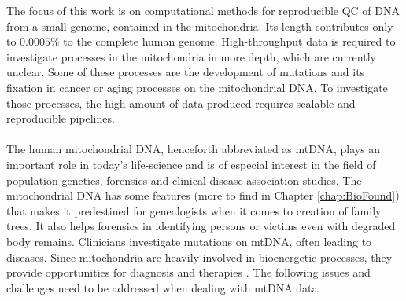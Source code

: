 The focus of this work is on computational methods for reproducible QC of DNA from a small genome, contained in the mitochondria. Its length contributes only to $0.0005\%$ to the complete human genome. High-throughput data is required to investigate processes in the mitochondria in more depth, which are currently unclear. Some of these processes are the development of mutations and its fixation in cancer or aging processes on the mitochondrial DNA. To investigate those processes, the high amount of data produced requires scalable and reproducible pipelines. 
\\
\\
The human mitochondrial DNA, henceforth abbreviated as mtDNA, plays an important role in today's life-science and is of especial interest in the field of population genetics, forensics and clinical disease association studies. The mitochondrial DNA has some features (more to find in Chapter \ref{chap:BioFound}) that makes it predestined for genealogists when it comes to creation of family trees. It also helps forensics in identifying persons or victims even with degraded body remains. Clinicians investigate mutations on mtDNA, often leading to diseases. Since mitochondria are heavily involved in bioenergetic processes, they provide opportunities for diagnosis and therapies \cite{Picard2016}.
The following issues and challenges need to be addressed when dealing with mtDNA data:
